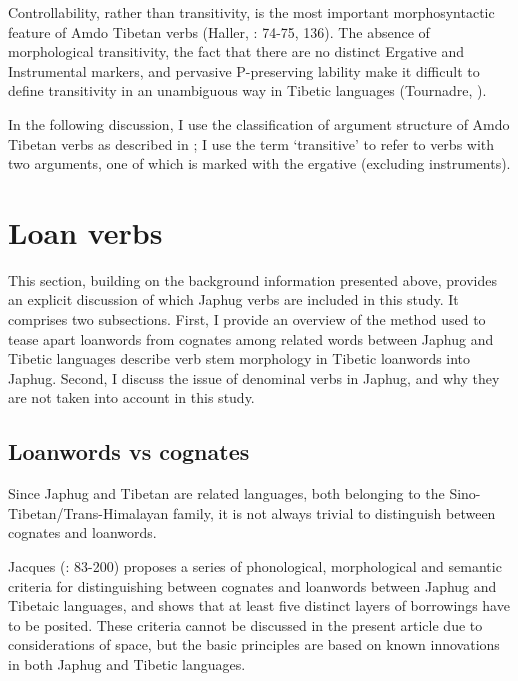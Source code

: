 \documentclass[oneside,a4paper,11pt]{article}
\begin{document}
Controllability, rather than transitivity, is the most important morphosyntactic feature of Amdo Tibetan verbs (Haller, \citeyear{haller04themchen}: 74-75, 136). The absence of morphological transitivity, the fact that there are no distinct Ergative and Instrumental markers, and pervasive P-preserving lability make it difficult to define transitivity in an unambiguous way in Tibetic languages (Tournadre, \citeyear{tournadre96erg}).

In the following discussion, I use the classification of argument structure of Amdo Tibetan verbs as described in \citet{haller04themchen}; I use the term `transitive' to refer to verbs with two arguments, one of which is marked with the ergative (excluding instruments). 


\section{Loan verbs}
This section, building on the background information presented above, provides an explicit discussion of which Japhug verbs are included in this study. It comprises two subsections. First, I provide an overview of the method used to tease apart loanwords from cognates among related words between Japhug and Tibetic languages describe verb stem morphology in Tibetic loanwords into Japhug. Second, I discuss the issue of denominal verbs in Japhug, and why they are not taken into account in this study. 

\subsection{Loanwords vs cognates} \label{sec:layers}
Since Japhug and Tibetan are related languages, both belonging to the Sino-Tibetan/Trans-Himalayan family, it is not always trivial to distinguish between cognates and loanwords. 

Jacques (\citeyear{jacques04these}: 83-200) proposes a series of phonological, morphological and semantic criteria for distinguishing between cognates and  loanwords between Japhug and Tibetaic languages, and shows that at least five distinct layers of borrowings have to be posited. These criteria cannot be discussed in the present article due to considerations of space, but the basic principles are based on known innovations in both Japhug and Tibetic languages. 
\end{document}
